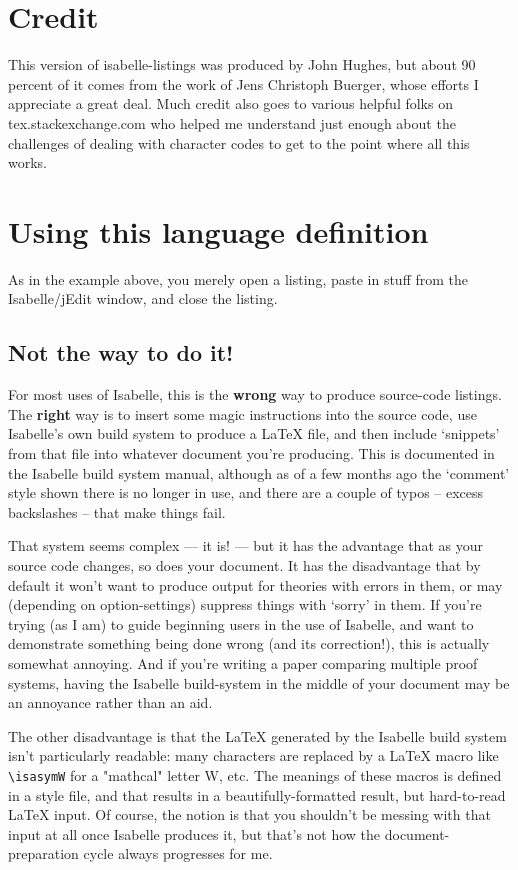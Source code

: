 \documentclass[11pt,notitlepage,openany,oneside]{book}
\begin{document}
\section{Credit}
This version of isabelle-listings was produced by John Hughes, but about 90 percent of it comes
from the work of Jens Christoph Buerger, whose efforts I appreciate a great deal. 
Much credit also goes to various helpful folks on tex.stackexchange.com who helped 
me understand just enough about the challenges of dealing with character codes to 
get to the point where all this works. 

\section{Using this language definition}
As in the example above, you merely open a listing, paste in stuff from the
Isabelle/jEdit window, and close the listing.

\subsection{Not the way to do it!}
For most uses of Isabelle, this is the \textbf{wrong} way to produce source-code
listings. The \textbf{right} way is to insert some magic instructions into the 
source code, use Isabelle's own build system to produce a LaTeX file, and then 
include `snippets' from that file into whatever document you're producing. 
This is documented in the Isabelle build system manual, although as of a few 
months ago the `comment' style shown there is no longer in use, and there are a 
couple of typos -- excess backslashes -- that make things fail. 

That system seems complex --- it is! --- but it has the advantage that as your 
source code changes, so does your document. It has the disadvantage that by 
default it won't want to produce output for theories with errors in them, or may 
(depending on option-settings) suppress things with `sorry' in them. If you're 
trying (as I am) to guide beginning users in the use of Isabelle, and want to 
demonstrate something being done wrong (and its correction!), this is actually 
somewhat annoying. And if you're writing a paper comparing multiple proof 
systems, having the Isabelle build-system in the middle of your document 
may be an annoyance rather than an aid. 

The other disadvantage is that the LaTeX generated by the Isabelle build 
system isn't particularly readable: many characters are replaced by a LaTeX 
macro like \verb|\isasymW| for a "mathcal" letter W, etc. The meanings of 
these macros is defined in a style file, and that results in a 
beautifully-formatted result, but hard-to-read LaTeX input. Of course, the 
notion is that you shouldn't be messing with that input at all once Isabelle 
produces it, but that's not how the document-preparation cycle always 
progresses for me. 
\end{document}
